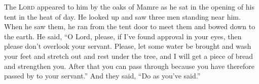 
\begin{inparaenum}
     The \textsc{Lord} appeared to him by the oaks of Mamre as he sat in the opening of his tent in the heat of day.%
     He looked up and saw three men standing near him. When he saw them, he ran from the tent door to meet them and bowed down to the earth.%
     He said, ``O Lord, please, if I've found approval in your eyes, then please don't overlook your servant.%
     Please, let some water be brought and wash your feet and stretch out and rest under the tree,%
     and I will get a piece of bread and strengthen you. After that you can pass through because you have therefore passed by to your servant.'' And they said, ``Do as you've said.''%
\end{inparaenum}
